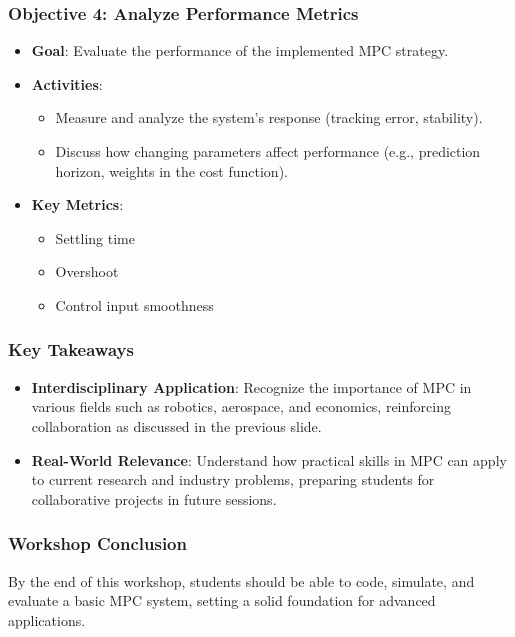 \documentclass[aspectratio=169]{beamer}
\begin{document}
\begin{frame}[fragile]
    \frametitle{Objective 4: Analyze Performance Metrics}
    \begin{itemize}
        \item \textbf{Goal}: Evaluate the performance of the implemented MPC strategy.
        \item \textbf{Activities}:
        \begin{itemize}
            \item Measure and analyze the system's response (tracking error, stability).
            \item Discuss how changing parameters affect performance (e.g., prediction horizon, weights in the cost function).
        \end{itemize}
        \item \textbf{Key Metrics}:
        \begin{itemize}
            \item Settling time
            \item Overshoot
            \item Control input smoothness
        \end{itemize}
    \end{itemize}
\end{frame}

\begin{frame}[fragile]
    \frametitle{Key Takeaways}
    \begin{itemize}
        \item \textbf{Interdisciplinary Application}: Recognize the importance of MPC in various fields such as robotics, aerospace, and economics, reinforcing collaboration as discussed in the previous slide.
        \item \textbf{Real-World Relevance}: Understand how practical skills in MPC can apply to current research and industry problems, preparing students for collaborative projects in future sessions.
    \end{itemize}
\end{frame}

\begin{frame}[fragile]
    \frametitle{Workshop Conclusion}
    By the end of this workshop, students should be able to code, simulate, and evaluate a basic MPC system, setting a solid foundation for advanced applications.
\end{frame}
\end{document}
